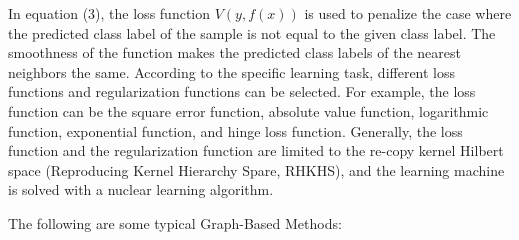 \documentclass[11pt,en]{elegantpaper}
\begin{document}
\begin{itemize}
	In equation (3), the loss function $ V (y, f (x)) $ is used to penalize the case where the predicted class label of the sample is not equal to the given class label. The smoothness of the function makes the predicted class labels of the nearest neighbors the same. According to the specific learning task, different loss functions and regularization functions can be selected. For example, the loss function can be the square error function, absolute value function, logarithmic function, exponential function, and hinge loss function. Generally, the loss function and the regularization function are limited to the re-copy kernel Hilbert space (Reproducing Kernel Hierarchy Spare, RHKHS), and the learning machine is solved with a nuclear learning algorithm.
\end{itemize}
The following are some typical Graph-Based Methods:
\end{document}
